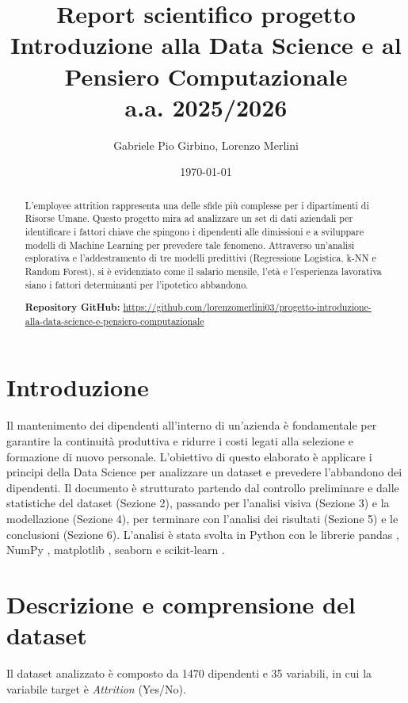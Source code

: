 \documentclass[11pt, a4paper]{article}
\title{\textbf{Report scientifico progetto\\Introduzione alla Data Science e al Pensiero Computazionale}\\[0.3cm] \large a.a. 2025/2026}
\author{Gabriele Pio Girbino, Lorenzo Merlini}
\date{\today}
\begin{document}
\maketitle

\begin{abstract}
L'employee attrition rappresenta una delle sfide più complesse per i dipartimenti di Risorse Umane. Questo progetto mira ad analizzare un set di dati aziendali per identificare i fattori chiave che spingono i dipendenti alle dimissioni e a sviluppare modelli di Machine Learning per prevedere tale fenomeno. Attraverso un'analisi esplorativa e l'addestramento di tre modelli predittivi (Regressione Logistica, k-NN e Random Forest), si è evidenziato come il salario mensile, l'età e l'esperienza lavorativa siano i fattori determinanti per l'ipotetico abbandono.

\vspace{0.5cm}
\textbf{Repository GitHub:} \url{https://github.com/lorenzomerlini03/progetto-introduzione-alla-data-science-e-pensiero-computazionale}
\end{abstract}

\newpage
\tableofcontents
\newpage

\section{Introduzione}
Il mantenimento dei dipendenti all'interno di un'azienda è fondamentale per garantire la continuità produttiva e ridurre i costi legati alla selezione e formazione di nuovo personale. L'obiettivo di questo elaborato è applicare i principi della Data Science per analizzare un dataset e prevedere l'abbandono dei dipendenti. 
Il documento è strutturato partendo dal controllo preliminare e dalle statistiche del dataset (Sezione 2), passando per l'analisi visiva (Sezione 3) e la modellazione (Sezione 4), per terminare con l'analisi dei risultati (Sezione 5) e le conclusioni (Sezione 6). L'analisi è stata svolta in Python con le librerie pandas \cite{pandas}, NumPy \cite{numpy}, matplotlib \cite{matplotlib}, seaborn \cite{seaborn} e scikit-learn \cite{sklearn}.

\section{Descrizione e comprensione del dataset}
Il dataset analizzato è composto da 1470 dipendenti e 35 variabili, in cui la variabile target è \textit{Attrition} (Yes/No).
\end{document}
